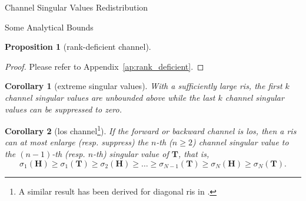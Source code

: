 \documentclass[journal]{IEEEtran}
\newtheorem{proposition}{Proposition}
\newtheorem{corollary}{Corollary}[proposition]
\begin{document}
\begin{section}{Channel Singular Values Redistribution}
\begin{subsection}{Some Analytical Bounds}
\begin{proposition}[rank-deficient channel]
		\end{proposition}
		\begin{proof}
			Please refer to Appendix~\ref{ap:rank_deficient}.
		\end{proof}


		\begin{corollary}[extreme singular values\label{co:extreme}]
			With a sufficiently large \gls{ris}, the first $k$ channel singular values are unbounded above while the last $k$ channel singular values can be suppressed to zero.
		\end{corollary}

		\begin{corollary}[\gls{los} channel\footnote{A similar result has been derived for diagonal \gls{ris} in \cite{Semmler2023}.}\label{co:los}]
			If the forward or backward channel is \gls{los}, then a \gls{ris} can at most enlarge (resp. suppress) the $n$-th ($n \ge 2$) channel singular value to the $(n-1)$-th (resp. $n$-th) singular value of $\mathbf{T}$, that is,
			\begin{equation}
				\sigma_1(\mathbf{H}) \ge \sigma_1(\mathbf{T}) \ge {\sigma_2(\mathbf{H})} \ge \ldots \ge \sigma_{N-1}(\mathbf{T}) \ge {\sigma_N(\mathbf{H})} \ge \sigma_N(\mathbf{T}).
				\label{iq:sv_bound_los}
			\end{equation}
		\end{corollary}


\end{subsection}
\end{section}
\end{document}
